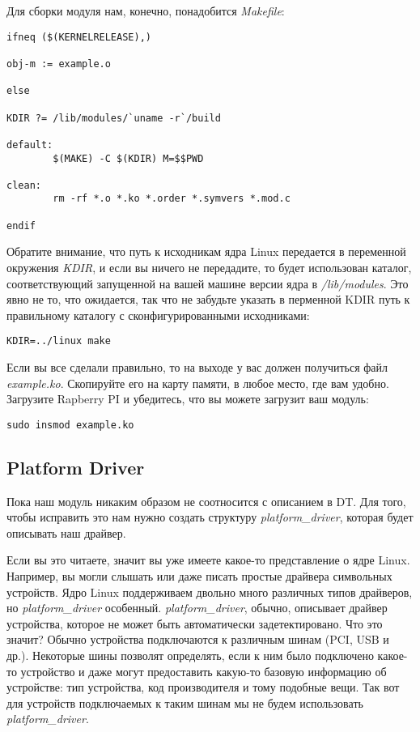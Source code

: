 Для сборки модуля нам, конечно, понадобится \emph{Makefile}:
\begin{lstlisting}
ifneq ($(KERNELRELEASE),)

obj-m := example.o

else

KDIR ?= /lib/modules/`uname -r`/build

default:
        $(MAKE) -C $(KDIR) M=$$PWD

clean:
        rm -rf *.o *.ko *.order *.symvers *.mod.c

endif
\end{lstlisting}

Обратите внимание, что путь к исходникам ядра Linux передается в переменной
окружения \emph{KDIR}, и если вы ничего не передадите, то будет использован
каталог, соответствующий запущенной на вашей машине версии ядра в
\emph{/lib/modules}. Это явно не то, что ожидается, так что не забудьте указать
в перменной KDIR путь к правильному каталогу с сконфигурированными исходниками:
\begin{lstlisting}
KDIR=../linux make
\end{lstlisting}

Если вы все сделали правильно, то на выходе у вас должен получиться файл
\emph{example.ko}. Скопируйте его на карту памяти, в любое место, где вам
удобно. Загрузите Rapberry PI и убедитесь, что вы можете загрузит ваш модуль:
\begin{lstlisting}
sudo insmod example.ko
\end{lstlisting}

\subsection{Platform Driver}

Пока наш модуль никаким образом не соотносится с описанием в DT. Для того, чтобы
исправить это нам нужно создать структуру \emph{platform\_driver}, которая будет
описывать наш драйвер.

Если вы это читаете, значит вы уже имеете какое-то представление о ядре Linux.
Например, вы могли слышать или даже писать простые драйвера символьных
устройств. Ядро Linux поддерживаем двольно много различных типов драйверов, но
\emph{platform\_driver} особенный. \emph{platform\_driver}, обычно, описывает
драйвер устройства, которое не может быть автоматически задетектировано. Что
это значит? Обычно устройства подключаются к различным шинам (PCI, USB и др.).
Некоторые шины позволят определять, если к ним было подключено какое-то
устройство и даже могут предоставить какую-то базовую информацию об устройстве:
тип устройства, код производителя и тому подобные вещи. Так вот для устройств
подключаемых к таким шинам мы не будем использовать \emph{platform\_driver}.

